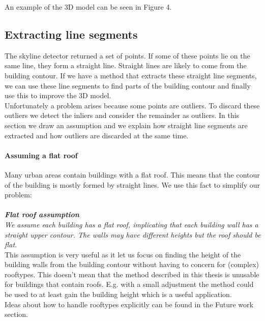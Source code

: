 An example of the 3D model can be seen in Figure 4.

\subsection{Extracting line segments}
\label{extractinglinesegments}
	The skyline detector returned a set of points. If some of these points lie
	on the same line, they form a straight line.  Straight lines are likely to
	come from the building contour. If we have a method that extracts these
	straight line segments, we can use these line segments to find parts of the
	building contour and finally use this to improve the 3D model.\\
	Unfortunately a problem arises because some points are outliers. To discard these outliers
	we detect the inliers and consider the remainder as outliers.  In this
	section we draw an assumption and we explain how straight line segments are extracted and how
	outliers are discarded at the same time.\\


	\paragraph{Assuming a flat roof}
	Many urban areas contain buildings with a flat roof. This means that the
	contour of the building is mostly formed by straight lines.  We use this
	fact to simplify our problem:\\\\
	\textbf{\emph{Flat roof assumption}}\\
	\emph{We assume each building has a flat roof, implicating that each building wall
	has a straight upper contour. The walls may have different heights but the roof should be flat.}\\

	This assumption is very useful as it let us focus on finding the height
	of the building walls from the building contour without having to concern
	for (complex) rooftypes.  This doesn't mean that the method described in
		this thesis is unusable for buildings that contain roofs. E.g.
		with a small adjustment the method could be used to at least
		gain the building height which is a useful application.\\
	Ideas about how to handle rooftypes explicitly can be found in the
	Future work section.\\

